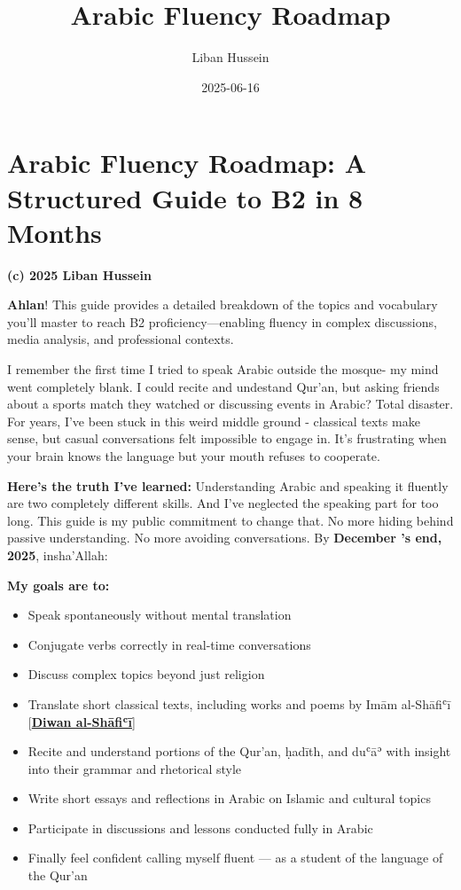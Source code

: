\documentclass[
  a4paper,
  DIV=11,
  numbers=noendperiod]{scrartcl}
\title{Arabic Fluency Roadmap}
\author{Liban Hussein}
\date{2025-06-16}
\providecommand{\tightlist}{%
  \setlength{\itemsep}{0pt}\setlength{\parskip}{0pt}}
\renewcommand*\contentsname{Table of contents}
\newcommand\contentsname{Table of contents}
\begin{document}
\maketitle

\renewcommand*\contentsname{Table of contents}
{
\hypersetup{linkcolor=}
\setcounter{tocdepth}{3}
\tableofcontents
}

\section{Arabic Fluency Roadmap: A Structured Guide to B2 in 8
Months}\label{arabic-fluency-roadmap-a-structured-guide-to-b2-in-8-months}

\textbf{(c) 2025 Liban Hussein}

\textbf{Ahlan}! This guide provides a detailed breakdown of the topics
and vocabulary you'll master to reach B2 proficiency---enabling fluency
in complex discussions, media analysis, and professional contexts.

I remember the first time I tried to speak Arabic outside the mosque- my
mind went completely blank. I could recite and undestand Qur'an, but
asking friends about a sports match they watched or discussing events in
Arabic? Total disaster. For years, I've been stuck in this weird middle
ground - classical texts make sense, but casual conversations felt
impossible to engage in. It's frustrating when your brain knows the
language but your mouth refuses to cooperate.

\textbf{Here's the truth I've learned:} Understanding Arabic and
speaking it fluently are two completely different skills. And I've
neglected the speaking part for too long. This guide is my public
commitment to change that. No more hiding behind passive understanding.
No more avoiding conversations. By \textbf{December 's end, 2025},
insha'Allah:

\textbf{My goals are to:}

\begin{itemize}
\tightlist
\item
  Speak spontaneously without mental translation
\item
  Conjugate verbs correctly in real-time conversations
\item
  Discuss complex topics beyond just religion
\item
  Translate short classical texts, including works and poems by Imām
  al-Shāfiʿī
  {[}\href{https://www.noor-book.com/en/ebook-\%D8\%AF\%D9\%8A\%D9\%88\%D8\%A7\%D9\%86-\%D8\%A7\%D9\%84\%D8\%A7\%D9\%85\%D8\%A7\%D9\%85-\%D8\%A7\%D9\%84\%D8\%B4\%D8\%A7\%D9\%81\%D8\%B9\%D9\%8A-pdf}{\textbf{Diwan
  al-Shāfiʿī}}{]}
\item
  Recite and understand portions of the Qur'an, ḥadīth, and duʿāʾ with
  insight into their grammar and rhetorical style
\item
  Write short essays and reflections in Arabic on Islamic and cultural
  topics
\item
  Participate in discussions and lessons conducted fully in Arabic
\item
  Finally feel confident calling myself fluent --- as a student of the
  language of the Qur'an
\end{itemize}
\end{document}
